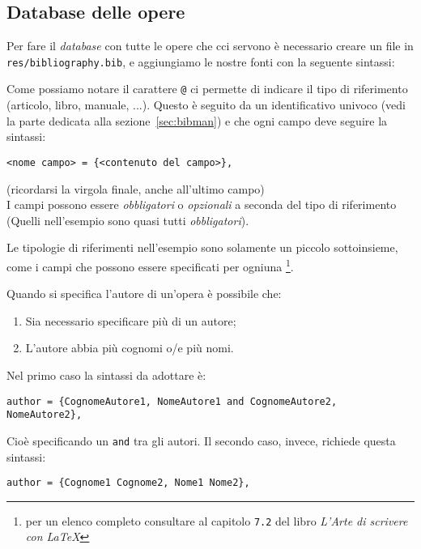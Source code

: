 \subsection{Database delle opere}
Per fare il \textit{database} con tutte le opere che cci servono è necessario
creare un file in \texttt{res/bibliography.bib}, e aggiungiamo le nostre fonti
con la seguente sintassi:

Come possiamo notare il carattere \verb!@! ci permette di indicare il tipo di 
riferimento (articolo, libro, manuale, ...). Questo è seguito da un 
identificativo univoco (vedi la parte dedicata alla sezione~\ref{sec:bibman}) 
e che ogni campo deve seguire la sintassi:
\begin{lstlisting}
<nome campo> = {<contenuto del campo>},
\end{lstlisting}
(ricordarsi la virgola finale, anche all'ultimo campo)\\
I campi possono essere \emph{obbligatori} o \emph{opzionali} a seconda del 
tipo di riferimento (Quelli nell'esempio sono quasi tutti \emph{obbligatori}).
\par Le tipologie di riferimenti nell'esempio sono solamente un piccolo 
sottoinsieme, come i campi che possono essere specificati per ogniuna
\footnote{per un elenco completo consultare al capitolo \texttt{7.2} del libro 
\textit{L'Arte di scrivere con \LaTeX{}}}.
\par Quando si specifica l'autore di un'opera è possibile che:
\begin{enumerate}
    \item Sia necessario specificare più di un autore;
    \item L'autore abbia più cognomi o/e più nomi.
\end{enumerate}
Nel primo caso la sintassi da adottare è:
\begin{lstlisting}
author = {CognomeAutore1, NomeAutore1 and CognomeAutore2, NomeAutore2},
\end{lstlisting}
Cioè specificando un \texttt{and} tra gli autori. Il secondo caso, invece, 
richiede questa sintassi:
\begin{lstlisting}
author = {Cognome1 Cognome2, Nome1 Nome2},
\end{lstlisting}

